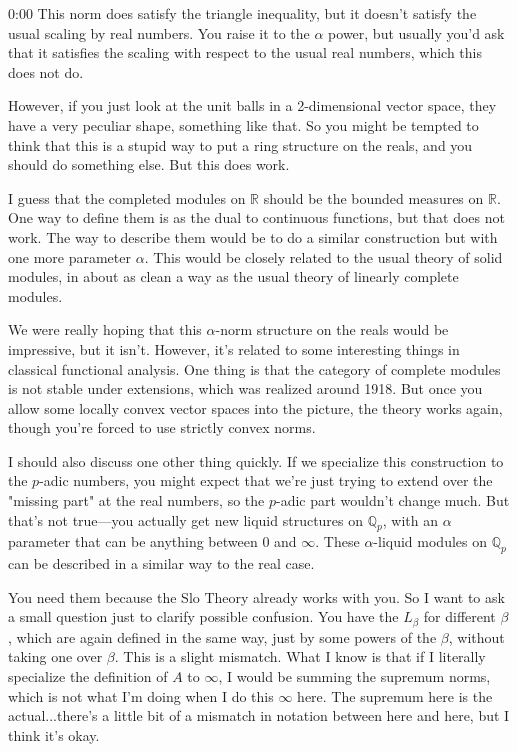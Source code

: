 \begin{unfinished}{0:00}
This norm does satisfy the triangle inequality, but it doesn't satisfy the usual scaling by real numbers. You raise it to the $\alpha$ power, but usually you'd ask that it satisfies the scaling with respect to the usual real numbers, which this does not do.

However, if you just look at the unit balls in a 2-dimensional vector space, they have a very peculiar shape, something like that. So you might be tempted to think that this is a stupid way to put a ring structure on the reals, and you should do something else. But this does work.

I guess that the completed modules on $\mathbb{R}$ should be the bounded measures on $\mathbb{R}$. One way to define them is as the dual to continuous functions, but that does not work. The way to describe them would be to do a similar construction but with one more parameter $\alpha$. This would be closely related to the usual theory of solid modules, in about as clean a way as the usual theory of linearly complete modules.

We were really hoping that this $\alpha$-norm structure on the reals would be impressive, but it isn't. However, it's related to some interesting things in classical functional analysis. One thing is that the category of complete modules is not stable under extensions, which was realized around 1918. But once you allow some locally convex vector spaces into the picture, the theory works again, though you're forced to use strictly convex norms.

I should also discuss one other thing quickly. If we specialize this construction to the $p$-adic numbers, you might expect that we're just trying to extend over the "missing part" at the real numbers, so the $p$-adic part wouldn't change much. But that's not true---you actually get new liquid structures on $\mathbb{Q}_p$, with an $\alpha$ parameter that can be anything between 0 and $\infty$. These $\alpha$-liquid modules on $\mathbb{Q}_p$ can be described in a similar way to the real case.

You need them because the Slo Theory already works with you. So I want to ask a small question just to clarify possible confusion. You have the $L_\beta$ for different $\beta$, which are again defined in the same way, just by some powers of the $\beta$, without taking one over $\beta$. This is a slight mismatch. What I know is that if I literally specialize the definition of $A$ to $\infty$, I would be summing the supremum norms, which is not what I'm doing when I do this $\infty$ here. The supremum here is the actual...there's a little bit of a mismatch in notation between here and here, but I think it's okay.


\end{unfinished}
